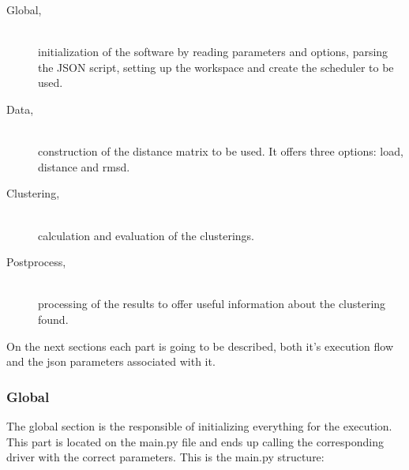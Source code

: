 \begin{description}
\item [Global,] \hfill \\ initialization of the software by reading parameters and options, parsing the JSON script, setting up the workspace and create the scheduler to be used.
\item [Data,] \hfill \\ construction of the distance matrix to be used. It offers three options: load, distance and rmsd.
\item [Clustering,] \hfill \\ calculation and evaluation of the clusterings.
\item [Postprocess,] \hfill \\ processing of the results to offer useful information about the clustering found.
\end{description}

On the next sections each part is going to be described, both it's execution flow and the json parameters associated with it.

\subsubsection{Global}

The global section is the responsible of initializing everything for the execution. This part is located on the main.py file and ends up calling the corresponding driver with the correct parameters. This is the main.py structure:

